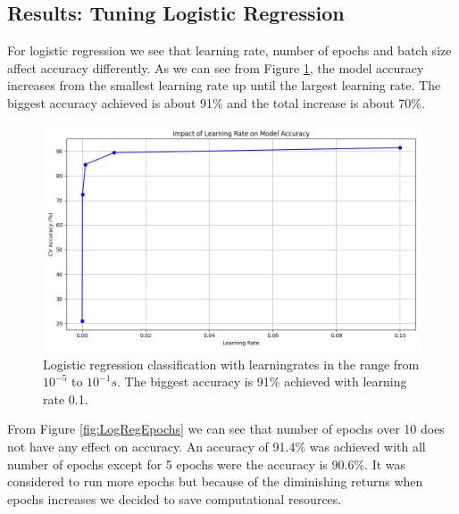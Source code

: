 \subsection{Results: Tuning Logistic Regression }
For logistic regression we see that learning rate, number of epochs and batch size affect accuracy differently. As we can see from Figure \ref{fig:LogRegLearningRate}, the model accuracy increases from the smallest learning rate up until the largest learning rate. The biggest accuracy achieved is about 91\% and the total increase is about 70\%. 

\begin{figure}[H]
    \centering
    \includegraphics[width=\textwidth]{results/logreg/learning_rate_study.png}
    \caption{Logistic regression classification with learningrates in the range from $10^{-5}$ to $10^{-1}s$. The biggest accuracy is 91\% achieved with learning rate 0.1. }
    \label{fig:LogRegLearningRate}
\end{figure}

\newpage
From Figure \ref{fig:LogRegEpochs} we can see that number of epochs over 10 does not have any effect on accuracy. An accuracy of 91.4\% was achieved with all number of epochs except for 5 epochs were the accuracy is 90.6\%. It was considered to run more epochs but because of the diminishing returns when epochs increases we decided to save computational resources. 

